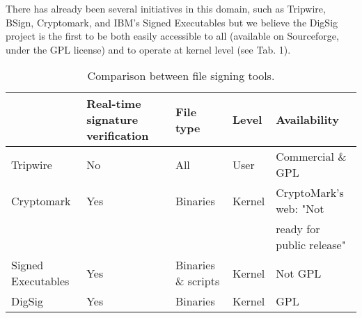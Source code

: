 \documentclass{article}
\begin{document}
There has already been several initiatives in this domain,
such as Tripwire, BSign, Cryptomark, and IBM's Signed Executables \cite{Tripwire, Bsign, Cryptomark, IBM-sign}
but we believe the DigSig project is the first to be both 
easily accessible to all (available on Sourceforge, 
under the GPL license) and to operate at kernel level (see Tab. 1).


\begin{table}[ht]
\begin{center}
\begin{tabular}{|p{2cm}|l|l|l|l|}
\hline
 & Real-time signature verification & File type & Level & Availability \\ 
\hline
Tripwire    & No           & All       & User      & Commercial  \& GPL \\ 
\hline
Cryptomark  & Yes          & Binaries  & Kernel    & CryptoMark's web: "Not  \\& & & &  ready for public release" \\
\hline
Signed  Executables    & Yes          & Binaries \& scripts & Kernel    & Not GPL   \\     
\hline
DigSig      & Yes          & Binaries  & Kernel    & GPL \\ 
\hline
\end{tabular}
\caption{Comparison between file signing tools.}
\label{tab:userspace}
\end{center}
\end{table}

\end{document}
